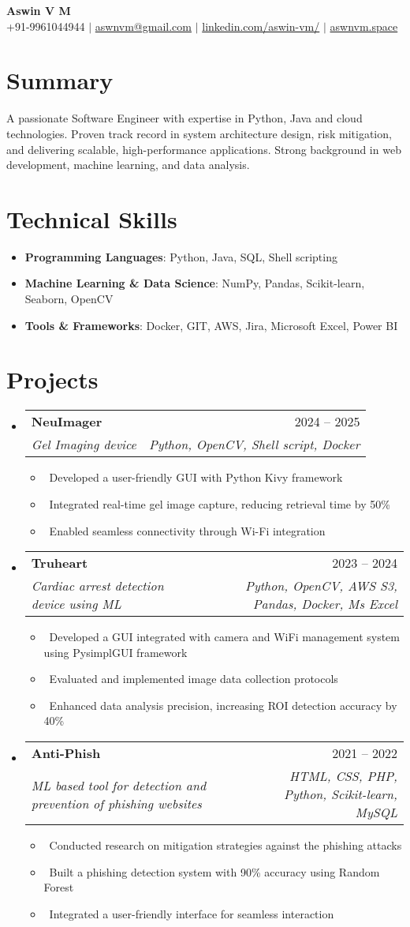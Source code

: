 \documentclass[letterpaper,10pt]{article}
\makeatletter
\newcommand{\resumeItem}[1]{\item\small{#1}}
\newcommand{\resumeSubheading}[4]{
\vspace{-1pt}\item
  \begin{tabular*}{0.97\textwidth}[t]{l@{\extracolsep{\fill}}r}
    \textbf{#1} & #2 \\
    \textit{#3} & \textit{#4} \\
  \end{tabular*}\vspace{-7pt}
}
\newcommand{\resumeSubHeadingList}{\begin{itemize}[leftmargin=0.15in, label={}]}
\newcommand{\resumeSubHeadingListEnd}{\end{itemize}}
\makeatother
\begin{document}
\begin{center}
  \textbf{\Huge Aswin V M} \\
  \small +91-9961044944 $|$ \href{mailto:aswnvm@gmail.com}{aswnvm@gmail.com} $|$
  \href{https://linkedin.com/in/aswin-vm}{linkedin.com/aswin-vm/} $|$
  \href{http://aswnvm.space}{aswnvm.space}
\end{center}

\section*{Summary}
A passionate Software Engineer with expertise in Python, Java and cloud technologies. Proven track record in system architecture design, risk mitigation, and delivering scalable, high-performance applications. Strong background in web development, machine learning, and data analysis.

\section{Technical Skills}
\resumeSubHeadingList
\resumeItem{\textbf{Programming Languages}: Python, Java, SQL, Shell scripting}
\resumeItem{\textbf{Machine Learning \& Data Science}: NumPy, Pandas, Scikit-learn, Seaborn, OpenCV}

\resumeItem{\textbf{Tools \& Frameworks}: Docker, GIT, AWS, Jira, Microsoft Excel, Power BI}
\resumeSubHeadingListEnd

\section{Projects}
\resumeSubHeadingList
\resumeSubheading
{NeuImager }{2024 -- 2025}
{Gel Imaging device}{Python, OpenCV, Shell script, Docker}
\resumeSubHeadingList
\resumeItem{\textbullet\	Developed a user-friendly GUI with Python Kivy framework}
\resumeItem{\textbullet\ 	Integrated real-time gel image capture, reducing retrieval time by 50\%}
\resumeItem{\textbullet\ 	Enabled seamless connectivity through Wi-Fi integration}
\resumeSubHeadingListEnd
\resumeSubheading
{Truheart}{2023 --  2024}
{Cardiac arrest detection device using ML}{Python, OpenCV, AWS S3, Pandas, Docker, Ms Excel}
\resumeSubHeadingList
\resumeItem{\textbullet\	Developed a GUI integrated with camera and WiFi management system using PysimplGUI framework }
\resumeItem{\textbullet\	Evaluated and implemented image data collection protocols}
\resumeItem{\textbullet\	Enhanced data analysis precision, increasing ROI detection accuracy by 40\%}
\resumeSubHeadingListEnd
\resumeSubheading
{Anti-Phish}{2021 --  2022}
{ML based tool for detection and prevention of phishing websites}{HTML, CSS, PHP, Python, Scikit-learn, MySQL}
\resumeSubHeadingList
\resumeItem{\textbullet\	Conducted research on mitigation strategies against the phishing attacks }
\resumeItem{\textbullet\	Built a phishing detection system with 90\% accuracy using Random Forest}
\resumeItem{\textbullet\	Integrated a user-friendly interface for seamless interaction}
\resumeSubHeadingListEnd
\resumeSubHeadingListEnd
\end{document}
